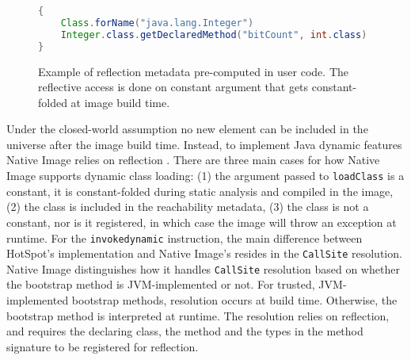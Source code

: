 \begin{figure}[ht]
    \centering
\begin{lstlisting}[language=Java]
{
    Class.forName("java.lang.Integer")
    Integer.class.getDeclaredMethod("bitCount", int.class)
}    
\end{lstlisting}
    \caption{Example of reflection metadata pre-computed in user code. The reflective access is done on constant argument that gets constant-folded at image build time.}
    \label{fig:computing_reflection_metadata_in_code_code}
\end{figure}

Under the closed-world assumption no new element can be included in the universe after the image build time. Instead, to implement Java dynamic features Native Image relies on reflection . 
There are three main cases for how Native Image supports dynamic class loading: (1) the argument passed to \verb|loadClass| is a constant, it is constant-folded during static analysis and compiled in the image, (2) the class is included in the reachability metadata, (3) the class is not a constant, nor is it registered, in which case the image will throw an exception at runtime.
For the \verb|invokedynamic| instruction, the main difference between HotSpot's implementation and Native Image's resides in the \verb|CallSite| resolution. Native Image distinguishes how it handles \verb|CallSite| resolution based on whether the bootstrap method is JVM-implemented or not. For trusted, JVM-implemented bootstrap methods, resolution occurs at build time. Otherwise, the bootstrap method is interpreted at runtime. The resolution relies on reflection, and requires the declaring class, the method and the types in the method signature to be registered for reflection.